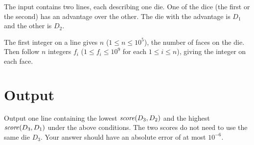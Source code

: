The input contains two lines, each describing one die.  One of the
dice (the first or the second) has an advantage over the other.  The
die with the advantage is $D_1$ and the other is $D_2$.

The first integer on a line gives $n$ ($1 \leq n \leq 10^5$), the number of faces on the die.
Then follow $n$ integers $f_i$ ($1 \leq f_i \leq 10^9$ for each $1 \leq i \leq n$), giving the integer on each face.




\section*{Output}

Output one line containing the lowest $\mbox{$\mathit{score}({D_3},{D_2})$}$ and the highest $\mbox{$\mathit{score}({D_3},{D_1})$}$ under the above conditions.
The two scores do not need to use the same die $D_3$.
Your answer should have an absolute error of at most $10^{-6}$.

